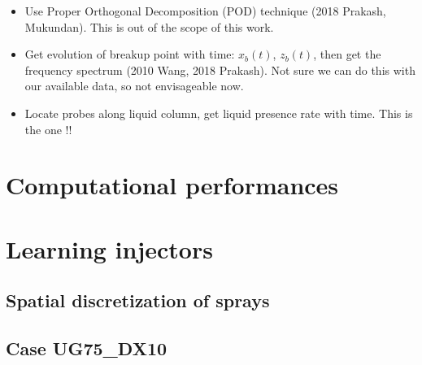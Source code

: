 \begin{itemize}

	\item Use Proper Orthogonal Decomposition (POD) technique (2018 Prakash, Mukundan). This is out of the scope of this work.
	
	\item Get evolution of breakup point with time: $x_b \left( t \right)$, $z_b \left( t \right)$, then get the frequency spectrum  (2010 Wang, 2018 Prakash). Not sure we can do this with our available data, so not envisageable now.
	
	\item Locate probes along liquid column, get liquid presence rate with time. This is the one !!

\end{itemize}

\section{Computational performances}
\label{subsec:ch5_computational_performances}


\section{Learning injectors}



\subsection{Spatial discretization of sprays}

\clearpage

\subsection{Case UG75\_DX10}





